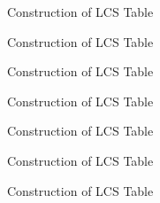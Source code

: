 \begin{frame}{Construction of LCS Table}
\begin{figure}
\centering

\end{figure}
\end{frame}

\begin{frame}{Construction of LCS Table}
\begin{figure}
\centering

\end{figure}
\end{frame}

\begin{frame}{Construction of LCS Table}
\begin{figure}
\centering

\end{figure}
\end{frame}

\begin{frame}{Construction of LCS Table}
\begin{figure}
\centering

\end{figure}
\end{frame}

\begin{frame}{Construction of LCS Table}
\begin{figure}
\centering

\end{figure}
\end{frame}

\begin{frame}{Construction of LCS Table}
\begin{figure}
\centering

\end{figure}
\end{frame}


\begin{frame}{Construction of LCS Table}
\begin{figure}
\centering

\end{figure}
\end{frame}


